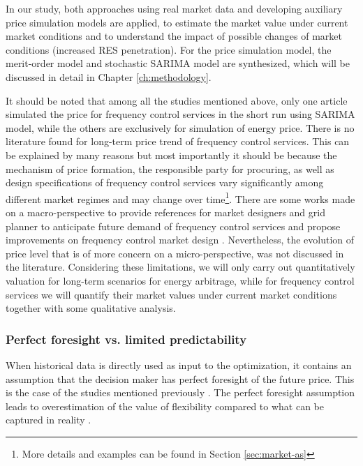 In our study, both approaches using real market data and developing auxiliary price simulation models are applied, to estimate the market value under current market conditions and to understand the impact of possible changes of market conditions (increased RES penetration). For the price simulation model, the merit-order model and stochastic SARIMA model are synthesized, which will be discussed in detail in Chapter \ref{ch:methodology}.

It should be noted that among all the studies mentioned above, only one article \cite{Alipour2017} simulated the price for frequency control services in the short run using SARIMA model, while the others are exclusively for simulation of energy price. There is no literature found for long-term price trend of frequency control services. This can be explained by many reasons but most importantly it should be because the mechanism of price formation, the responsible party for procuring, as well as design specifications of frequency control services vary significantly among different market regimes and may change over time\footnote{More details and examples can be found in Section  \ref{sec:market-as}}. There are some works made on a macro-perspective to provide references for market designers and grid planner to anticipate future demand of frequency control services and propose improvements on frequency control market design \cite{GEEnergyConsulting2014,Scherer2016}. Nevertheless, the evolution of price level that is of more concern on a micro-perspective, was not discussed in the literature. Considering these limitations, we will only carry out quantitatively valuation for long-term scenarios for energy arbitrage, while for frequency control services we will quantify their market values under current market conditions together with some qualitative analysis.

\subsubsection{Perfect foresight vs. limited predictability}
\label{sec:perfect-forecast}
When historical data is directly used as input to the optimization, it contains an assumption that the decision maker has perfect foresight of the future price. This is the case of the studies mentioned previously \cite{Walawalkar2007,Sioshansi2009,Byrne2012,Bradbury2014,McConnell2015,Berrada2016,Salles2017}. The perfect foresight assumption leads to overestimation of the value of flexibility compared to what can be captured in reality \cite{Zucker2013}.


